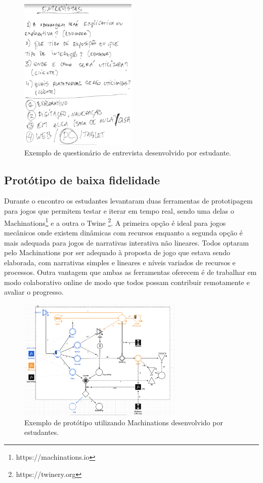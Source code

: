 \documentclass[12pt, onecolumn]{IEEEtran}
\begin{document}
\begin{figure}[H]
    \centering
    \includegraphics[width=0.5\textwidth]{imagens/exemplo-entrevista.png}
    \caption{Exemplo de questionário de entrevista desenvolvido por estudante.}
    \label{fig:mesh1}
\end{figure}

\subsection{Protótipo de baixa fidelidade}

Durante o encontro os estudantes levantaram duas ferramentas de prototipagem para jogos que permitem testar e iterar em tempo real, sendo uma delas o Machinations\footnote{https://machinations.io} e a outra o Twine \footnote{https://twinery.org}. A primeira opção é ideal para jogos mecânicos onde existem dinâmicas com recursos\cite{b12} enquanto a segunda opção é mais adequada para jogos de narrativas interativa não lineares\cite{b17}. Todos optaram pelo Machinations por ser adequado à proposta de jogo que estava sendo elaborada, com narrativas simples e lineares e níveis variados de recursos e processos. Outra vantagem que ambas as ferramentas oferecem é de trabalhar em modo colaborativo online de modo que todos possam contribuir remotamente e avaliar o progresso.

\begin{figure}[H]
    \centering
    \includegraphics[width=0.7\textwidth]{imagens/exemplo-machinations.png}
    \caption{Exemplo de protótipo utilizando Machinations desenvolvido por estudantes.}
    \label{fig:mesh1}
\end{figure}
\end{document}
